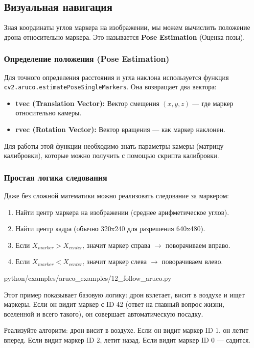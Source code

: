 \subsection{Визуальная навигация}

Зная координаты углов маркера на изображении, мы можем вычислить положение дрона относительно маркера. Это называется \textbf{Pose Estimation} (Оценка позы).

\subsubsection*{Определение положения (Pose Estimation)}
Для точного определения расстояния и угла наклона используется функция \texttt{cv2.aruco.estimatePoseSingleMarkers}.
Она возвращает два вектора:
\begin{itemize}
    \item \textbf{tvec (Translation Vector):} Вектор смещения $(x, y, z)$ — где маркер относительно камеры.
    \item \textbf{rvec (Rotation Vector):} Вектор вращения — как маркер наклонен.
\end{itemize}

Для работы этой функции необходимо знать параметры камеры (матрицу калибровки), которые можно получить с помощью скрипта калибровки.

\subsubsection*{Простая логика следования}
Даже без сложной математики можно реализовать следование за маркером:
\begin{enumerate}
    \item Найти центр маркера на изображении (среднее арифметическое углов).
    \item Найти центр кадра (обычно 320x240 для разрешения 640x480).
    \item Если $X_{marker} > X_{center}$, значит маркер справа $\rightarrow$ поворачиваем вправо.
    \item Если $X_{marker} < X_{center}$, значит маркер слева $\rightarrow$ поворачиваем влево.
\end{enumerate}

\begin{codefile}[python]{python/examples/aruco_examples/12_follow_aruco.py}
\end{codefile}

Этот пример показывает базовую логику: дрон взлетает, висит в воздухе и ищет маркеры. Если он видит маркер с ID 42 (ответ на главный вопрос жизни, вселенной и всего такого), он совершает автоматическую посадку.

\begin{taskbox}
Реализуйте алгоритм: дрон висит в воздухе. Если он видит маркер ID 1, он летит вперед. Если видит маркер ID 2, летит назад. Если видит маркер ID 0 — садится.
\end{taskbox}
